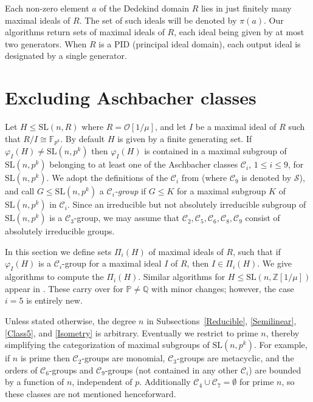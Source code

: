 \documentclass[11pt]{amsart}
\theoremstyle{definition}
\theoremstyle{remark}
\newcommand{\F}{\mathbb{F}}
\newcommand{\Z}{\mathbb{Z}}
\newcommand{\Q}{\mathbb{Q}}
\renewcommand{\P}{\mathbb{P}}
\newcommand{\SL}{\mathrm{SL}}
\newcommand{\calc}{\mathscr{C}}
\newcommand{\cals}{\mathscr{S}}
\begin{document}
Each non-zero element $a$ of the Dedekind domain $R$ 
lies in just finitely many maximal ideals of $R$. 
The set of such ideals will be denoted by $\pi(a)$. 
Our algorithms return sets of maximal ideals of $R$, 
each ideal being given by at most two generators. When $R$ 
is a PID (principal ideal domain),
 each output ideal is designated by a single generator. 

\section{Excluding Aschbacher classes} 
\label{Asch}

Let $H \leq \SL(n, R)$ where $R= \mathcal{O}[1/\mu]$, 
and let $I$ be a maximal ideal of $R$ such that 
$R/I \cong \allowbreak \F_{p^k}$.  By default $H$ is given 
by a finite generating set. If $\varphi_I(H) \neq \SL(n, p^k)$
then $\varphi_I(H)$ is contained in a maximal subgroup of
$\SL(n, p^k)$ belonging to at least one of the Aschbacher 
classes $\calc_i$, $1 \leq \allowbreak i \leq \allowbreak 9$, 
for $\SL(n, p^k)$.
 We adopt the definitions of the $\mathscr{C}_i$ from \cite{Brayetal}
(where $\calc_9$ is denoted by $\cals$), and call $G\leq \SL(n,p^k)$ 
a \emph{$\calc_i$-group} if $G\leq K$ for a maximal subgroup $K$ of 
$\SL(n,p^k)$ in $\calc_i$. Since an irreducible but not absolutely 
irreducible subgroup of $\SL(n,p^k)$ is a $\calc_3$-group, we may 
assume that $\calc_2, \mathscr{C}_5, \calc_6, \calc_8, \calc_9$ consist 
of absolutely irreducible groups. 

In this section we define sets $\Pi_i(H)$ of maximal ideals of $R$,
such that if $\varphi_I(H)$ is a $\calc_i$-group for a maximal ideal 
$I$ of $R$, then $I\in \Pi_i(H)$. We give algorithms to compute the 
$\Pi_i(H)$. Similar algorithms for $H\leq \SL(n,\Z[1/\mu])$ appear 
in \cite{ExpMath}. These carry over for $\P \neq \Q$ with minor 
changes; however, the case $i=5$ is entirely new.

Unless stated otherwise, the degree $n$ in Subsections~\ref{Reducible}, 
\ref{Semilinear}, \ref{Class5}, and \ref{Isometry} is arbitrary.
Eventually we restrict to prime $n$, thereby simplifying 
the categorization of maximal subgroups of $\SL(n,p^k)$. 
For example, if $n$ is prime then $\calc_2$-groups are monomial, 
$\calc_3$-groups are metacyclic,  and the orders of 
$\calc_6$-groups and $\calc_9$-groups (not contained in any other
$\calc_i$) are bounded by a function of $n$, independent of $p$.
Additionally $\calc_4\cup \calc_7=\emptyset$ for prime $n$, so
 these classes are not mentioned henceforward.
\end{document}
